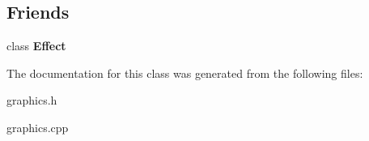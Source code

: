 \subsection*{Friends}
\begin{DoxyCompactItemize}
\item 
\hypertarget{classg2c_1_1_buffer_ac8649272bb0576cc72f2486439664efe}{
class {\bfseries Effect}}
\label{classg2c_1_1_buffer_ac8649272bb0576cc72f2486439664efe}

\end{DoxyCompactItemize}


The documentation for this class was generated from the following files:\begin{DoxyCompactItemize}
\item 
graphics.h\item 
graphics.cpp\end{DoxyCompactItemize}
